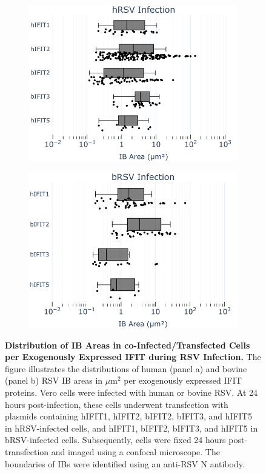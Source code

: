 \begin{figure}
    \begin{subfigure}{0.495\textwidth}
        \caption{}
        \includegraphics[width=1\linewidth]{09. Chapter 4/Figs/02. Overexpression/01. sizes-oe-hrsv.pdf} 
    \end{subfigure}
    \begin{subfigure}{0.495\textwidth}
        \caption{}
        \includegraphics[width=1\linewidth]{09. Chapter 4/Figs/02. Overexpression/02. sizes-oe-brsv.pdf}
    \end{subfigure}
    \caption[Distribution of IB Areas in co-Infected/Transfected Cells per Exogenously Expressed IFIT during RSV Infection.]{\textbf{Distribution of IB Areas in co-Infected/Transfected Cells per Exogenously Expressed IFIT during RSV Infection.} The figure illustrates the distributions of human (panel a) and bovine (panel b) RSV IB areas in \(\mu \mbox{m}^2\) per exogenously expressed IFIT proteins. Vero cells were infected with human or bovine RSV. At 24 hours post-infection, these cells underwent transfection with plasmids containing hIFIT1, hIFIT2, bIFIT2, bIFIT3, and hIFIT5 in hRSV-infected cells, and hIFIT1, bIFIT2, bIFIT3, and hIFIT5 in bRSV-infected cells. Subsequently, cells were fixed 24 hours post-transfection and imaged using a confocal microscope. The boundaries of IBs were identified using an anti-RSV N antibody.}
    \label{fig:Distribution_IB_Areas_coInfected_Transfected_Cells_IFIT_RSV}
\end{figure}

